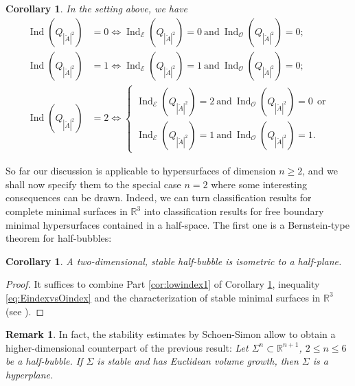 \documentclass[10pt]{amsart}
\let\mathcal\mathscr
\newcounter{cas}
\DeclareMathOperator{\Ind}{Ind}
\newtheorem{cor}[thm]{Corollary}
\theoremstyle{definition}
\newtheorem{rmk}[thm]{Remark}
\newcommand{\R}{\mathbb{R}}
\begin{document}
\begin{cor}\label{cor:lowindex}
In the setting above, we have
\begin{align*}
\tag{1}\label{cor:lowindex1}\Ind(Q_{|\check{A}|^2})&=0 \iff\Ind_{\mathcal{E}}(Q_{|\check{A}|^2})=0 \ \text{and} \ \Ind_{\mathcal{O}}(Q_{|\check{A}|^2})=0; \\
\tag{2}\label{cor:lowindex2}\Ind(Q_{|\check{A}|^2})&=1 \iff\Ind_{\mathcal{E}}(Q_{|\check{A}|^2})=1 \ \text{and} \ \Ind_{\mathcal{O}}(Q_{|\check{A}|^2})=0;\\
\tag{3}\label{cor:lowindex3}\Ind(Q_{|\check{A}|^2})&=2 \iff
\begin{cases}\Ind_{\mathcal{E}}(Q_{|\check{A}|^2})=2 \ \text{and} \ \Ind_{\mathcal{O}}(Q_{|\check{A}|^2})=0 \ \ \text{or} \\
\Ind_{\mathcal{E}}(Q_{|\check{A}|^2})=1 \ \text{and} \ \Ind_{\mathcal{O}}(Q_{|\check{A}|^2})=1.
\end{cases}
\end{align*}
\end{cor}

So far our discussion is applicable to hypersurfaces of dimension $n\geq 2$, and we shall now specify them to the special case $n=2$ where some interesting consequences can be drawn.
Indeed, we can turn classification results for complete minimal surfaces in $\R^{3}$ into classification results for free boundary minimal hypersurfaces contained in a half-space. The first one is a Bernstein-type theorem for half-bubbles:

\begin{cor}\label{cor:stable}
A two-dimensional, stable half-bubble is isometric to a half-plane.
\end{cor}

\begin{proof}
It suffices to combine Part \eqref{cor:lowindex1} of Corollary \ref{cor:lowindex}, inequality \eqref{eq:EindexvsOindex} and the characterization of stable minimal surfaces in $\R^{3}$ (see \cite{dCP79,FCS80,Pog81}).
\end{proof}

\begin{rmk}\label{rmk:higher-stable}
In fact, the stability estimates by Schoen-Simon allow to obtain a higher-dimensional counterpart of the previous result: \emph{Let $\Sigma^n\subset\R^{n+1}$, $2\leq n\leq 6$ be a half-bubble. If $\Sigma$ is stable and has Euclidean volume growth, then $\Sigma$ is a hyperplane.}
\end{rmk}
\end{document}
